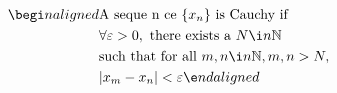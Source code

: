 \documentclass[preview]{standalone}
\begin{document}
\begin{align*}
\begi n {alig n ed}&\text{A seque n ce } \{ x_n \} \text{ is Cauchy if } \\& \forall  \varepsilon  > 0, \text{ there exists a }  N  \i n   \mathbb{N}  \\& \text{such that for all }  m ,  n  \i n   \mathbb{N} ,  m ,  n  >  N , \\&  |x_m - x_n|  <  \varepsilon \e n d{alig n ed}
\end{align*}
\end{document}
